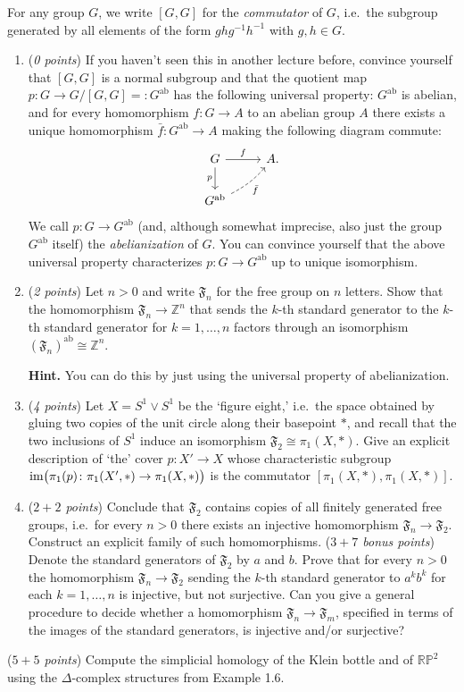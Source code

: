 \begin{sheetexercise}
For any group $G$, we write $[G,G]$ for the \emph{commutator} of $G$, i.e.~the subgroup generated by all elements of the form $ghg^{-1}h^{-1}$ with $g,h\in G$.
\begin{enumerate}
\item (\textit{0 points}) If you haven't seen this in another lecture before, convince yourself that $[G,G]$ is a normal subgroup and that the quotient map $p\colon G\to G/[G,G]\mathrel{=:} G^{\text{ab}}$ has the following universal property: $G^{\text{ab}}$ is abelian, and for every homomorphism $f\colon G\to A$ to an abelian group $A$ there exists a unique homomorphism $\bar{f}\colon G^{\text{ab}}\to A$ making the following diagram commute:
\begin{equation*}
\begin{tikzcd}
G\arrow[d, "p"'] \arrow[r,"f"] & A.\\
G^{\text{ab}}\arrow[ur, dashed, "\bar f"', bend right=10pt]
\end{tikzcd}
\end{equation*}
We call $p\colon G\to G^{\text{ab}}$ (and, although somewhat imprecise, also just the group $G^{\text{ab}}$ itself) the \emph{abelianization} of $G$. You can convince yourself that the above universal property characterizes $p\colon G\to G^{\text{ab}}$ up to unique isomorphism.
\item (\textit{2 points}) Let $n> 0$ and write $\mathfrak F_n$ for the free group on $n$ letters. Show that the homomorphism $\mathfrak F_n\to\mathbb Z^n$ that sends the $k$-th standard generator to the $k$-th standard generator for $k=1,\dots,n$ factors through an isomorphism $(\mathfrak F_n)^{\text{ab}}\cong\mathbb Z^n$.

\textbf{Hint.} You can do this by just using the universal property of abelianization.
\item (\textit{4 points}) Let $X=S^1\vee S^1$ be the `figure eight,' i.e.~the space obtained by gluing two copies of the unit circle along their basepoint $*$, and recall that the two inclusions of $S^1$ induce an isomorphism $\mathfrak F_2\cong\pi_1(X,*)$. Give an explicit description of `the' cover $p\colon X'\to X$ whose characteristic subgroup $\textup{im}\big(\pi_1(p)\colon \pi_1(X',*)\to\pi_1(X,*)\big)$ is the commutator $[\pi_1(X,*),\pi_1(X,*)]$.
\item (\textit{$2+2$ points}) Conclude that $\mathfrak F_2$ contains copies of all finitely generated free groups, i.e.~for every $n>0$ there exists an injective homomorphism $\mathfrak F_n\to\mathfrak F_2$. Construct an explicit family of such homomorphisms.
\staritem (\textit{$3+7$ bonus points}) Denote the standard generators of $\mathfrak F_2$ by $a$ and $b$. Prove that for every $n>0$ the homomorphism $\mathfrak F_n\to\mathfrak F_2$ sending the $k$-th standard generator to $a^kb^k$ for each $k=1,\dots,n$ is injective, but not surjective. Can you give a general procedure to decide whether a homomorphism $\mathfrak F_n\to\mathfrak F_m$, specified in terms of the images of the standard generators, is injective and/or surjective?
\end{enumerate}
\end{sheetexercise}

\begin{sheetexercise} (\textit{$5+5$ points})
	Compute the simplicial homology of the Klein bottle and of $\mathbb{RP}^2$ using the $\Delta$-complex structures from Example 1.6.
\end{sheetexercise}


